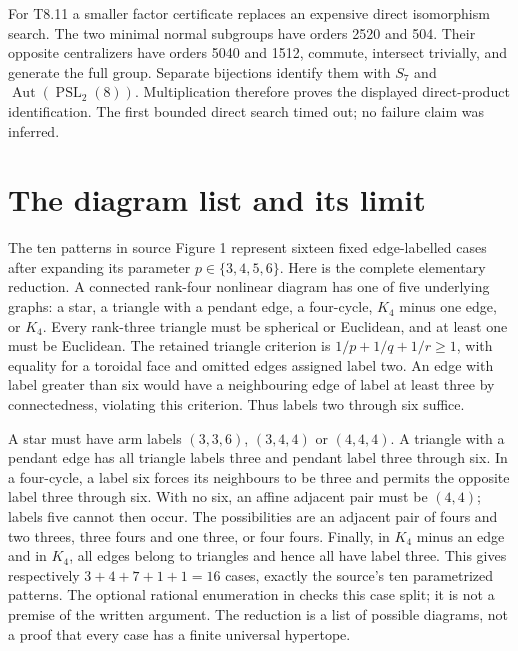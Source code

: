 \documentclass[10pt,a4paper]{article}
\begin{document}
For T8.11 a smaller factor certificate replaces an expensive direct
isomorphism search. The two minimal normal subgroups have orders 2520 and
504. Their opposite centralizers have orders 5040 and 1512, commute,
intersect trivially, and generate the full group. Separate bijections identify
them with $S_7$ and $\operatorname{Aut}(\operatorname{PSL}_2(8))$.
Multiplication therefore proves the displayed direct-product identification.
The first bounded direct search timed out; no failure claim was inferred.
\small\normalsize

\section{The diagram list and its limit}
The ten patterns in source Figure 1 represent sixteen fixed edge-labelled
cases after expanding its parameter $p\in\{3,4,5,6\}$. Here is the
complete elementary reduction. A connected rank-four nonlinear diagram
has one of five underlying graphs: a star, a triangle with a pendant
edge, a four-cycle, $K_4$ minus one edge, or $K_4$. Every rank-three
triangle must be spherical or Euclidean, and at least one must be
Euclidean. The retained triangle criterion is
$1/p+1/q+1/r\ge1$, with equality for a toroidal face and omitted
edges assigned label two. An edge with label greater than six would
have a neighbouring edge of label at least three by connectedness,
violating this criterion. Thus labels two through six suffice.

A star must have arm labels $(3,3,6)$, $(3,4,4)$ or $(4,4,4)$.
A triangle with a pendant edge has all triangle labels three and
pendant label three through six. In a four-cycle, a label six forces
its neighbours to be three and permits the opposite label three
through six. With no six, an affine adjacent pair must be $(4,4)$;
labels five cannot then occur. The possibilities are an adjacent pair
of fours and two threes, three fours and one three, or four fours.
Finally, in $K_4$ minus an edge and in $K_4$, all edges belong to
triangles and hence all have label three. This gives respectively
$3+4+7+1+1=16$ cases, exactly the source's ten parametrized patterns.
The optional rational enumeration in  checks
this case split; it is not a premise of the written argument.
The reduction is a list of possible diagrams, not a proof that every
case has a finite universal hypertope.
\end{document}
